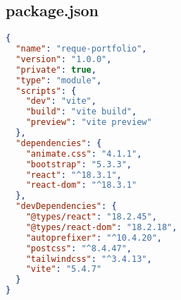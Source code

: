 \documentclass[11pt]{article}
\begin{document}
\subsection*{package.json}
\begin{lstlisting}[language=JSON]
{
  "name": "reque-portfolio",
  "version": "1.0.0",
  "private": true,
  "type": "module",
  "scripts": {
    "dev": "vite",
    "build": "vite build",
    "preview": "vite preview"
  },
  "dependencies": {
    "animate.css": "4.1.1",
    "bootstrap": "5.3.3",
    "react": "^18.3.1",
    "react-dom": "^18.3.1"
  },
  "devDependencies": {
    "@types/react": "18.2.45",
    "@types/react-dom": "18.2.18",
    "autoprefixer": "^10.4.20",
    "postcss": "^8.4.47",
    "tailwindcss": "^3.4.13",
    "vite": "5.4.7"
  }
}
\end{lstlisting}
\end{document}
